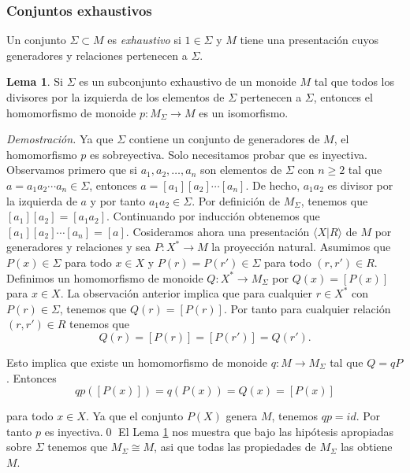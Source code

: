 \documentclass[12pt]{article}
\theoremstyle{definition}
\newtheorem{lema}{Lema}[section]
\begin{document}
\subsubsection{Conjuntos exhaustivos}

Un conjunto $\Sigma\subset M$ es \textit{exhaustivo} si $1\in\Sigma$ y $M$ tiene una presentación cuyos generadores y relaciones pertenecen a $\Sigma$.

\begin{lema}
Si $\Sigma$ es un subconjunto exhaustivo de un monoide $M$ tal que todos los divisores por la izquierda de los elementos de $\Sigma$ pertenecen a $\Sigma$, entonces el homomorfismo de monoide $p:M_\Sigma\rightarrow M$ es un isomorfismo.
\label{lema:iso_mono}
\end{lema}

\textit{Demostración.} Ya que $\Sigma$ contiene un conjunto de generadores de $M$, el homomorfismo $p$ es sobreyectiva. Solo necesitamos probar que es inyectiva. Observamos primero que si $a_1,a_2,\ldots,a_n$ son elementos de $\Sigma$ con $n\geq 2$ tal que $a=a_1a_2\cdots a_n\in\Sigma$, entonces $a=[a_1][a_2]\cdots [a_n]$. De hecho, $a_1a_2$ es divisor por la izquierda de $a$ y por tanto $a_1a_2\in\Sigma$. Por definición de $M_\Sigma$, tenemos que $[a_1][a_2]=[a_1a_2]$. Continuando por inducción obtenemos que $[a_1][a_2]\cdots[a_n]=[a]$.
\newline
\newline
Cosideramos ahora una presentación $\langle X| R\rangle$ de $M$ por generadores y relaciones y sea $P:X^*\rightarrow M$ la proyección natural. Asumimos que $P(x)\in\Sigma$ para todo $x\in X$ y $P(r)=P(r')\in\Sigma$ para todo $(r,r')\in R$. Definimos un homomorfismo de monoide $Q:X^*\rightarrow M_\Sigma$ por $Q(x)=[P(x)]$ para $x\in X$. La observación anterior implica que para cualquier $r\in X^*$ con $P(r)\in\Sigma$, tenemos que $Q(r)=[P(r)]$. Por tanto para cualquier relación $(r,r')\in R$ tenemos que
$$Q(r)=[P(r)]=[P(r')]=Q(r').$$

Esto implica que existe un homomorfismo de monoide $q:M\rightarrow M_\Sigma$ tal que $Q=qP$. Entonces
$$qp([P(x)])=q(P(x))=Q(x)=[P(x)]$$

para todo $x\in X$. Ya que el conjunto $P(X)$ genera $M$, tenemos $qp=id$. Por tanto $p$ es inyectiva.\qed
\newline
\newline
El Lema \ref{lema:iso_mono} nos muestra que bajo las hipótesis apropiadas sobre $\Sigma$ tenemos que $M_\Sigma\cong M$, asi que todas las propiedades de $M_\Sigma$ las obtiene $M$.
\end{document}
